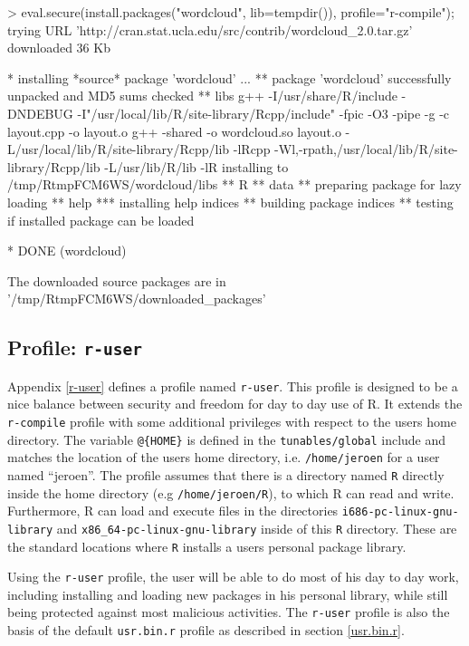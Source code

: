 \documentclass[article]{jss}
\begin{document}
\begin{CodeChunk}
\begin{CodeInput}
> eval.secure(install.packages("wordcloud", lib=tempdir()), profile="r-compile");
trying URL 'http://cran.stat.ucla.edu/src/contrib/wordcloud_2.0.tar.gz'
downloaded 36 Kb

* installing *source* package 'wordcloud' ...
** package 'wordcloud' successfully unpacked and MD5 sums checked
** libs
g++ -I/usr/share/R/include -DNDEBUG -I"/usr/local/lib/R/site-library/Rcpp/include"
   -fpic  -O3 -pipe  -g  -c layout.cpp -o layout.o
g++ -shared -o wordcloud.so layout.o -L/usr/local/lib/R/site-library/Rcpp/lib
   -lRcpp -Wl,-rpath,/usr/local/lib/R/site-library/Rcpp/lib -L/usr/lib/R/lib -lR
installing to /tmp/RtmpFCM6WS/wordcloud/libs
** R
** data
** preparing package for lazy loading
** help
*** installing help indices
** building package indices
** testing if installed package can be loaded

* DONE (wordcloud)

The downloaded source packages are in
	'/tmp/RtmpFCM6WS/downloaded_packages'
\end{CodeInput}
\end{CodeChunk}

\subsection[Profile: r-user]{Profile: \texttt{r-user}}

Appendix \ref{r-user} defines a profile named \texttt{r-user}. This profile is
designed to be a nice balance between security and freedom for day to day use of
R. It extends the \texttt{r-compile} profile with some additional privileges
with respect to the users home directory. The variable \texttt{@\{HOME\}} is
defined in the \texttt{tunables/global} include and matches the location of the
users home directory, i.e. \texttt{/home/jeroen} for a user named ``jeroen''.
The profile assumes that there is a directory named \texttt{R} directly inside
the home directory (e.g \texttt{/home/jeroen/R}), to which R can read and
write. Furthermore, R can load and execute files in the directories
\texttt{i686-pc-linux-gnu-library} and \texttt{x86\_64-pc-linux-gnu-library}
inside of this \texttt{R} directory. These are the standard locations where
\texttt{R} installs a users personal package library.

Using the \texttt{r-user} profile, the user will be able to do most of his day
to day work, including installing and loading new packages in his personal
library, while still being protected against most malicious activities. The
\texttt{r-user} profile is also the basis of the default \texttt{usr.bin.r}
profile as described in section \ref{usr.bin.r}.
\end{document}

